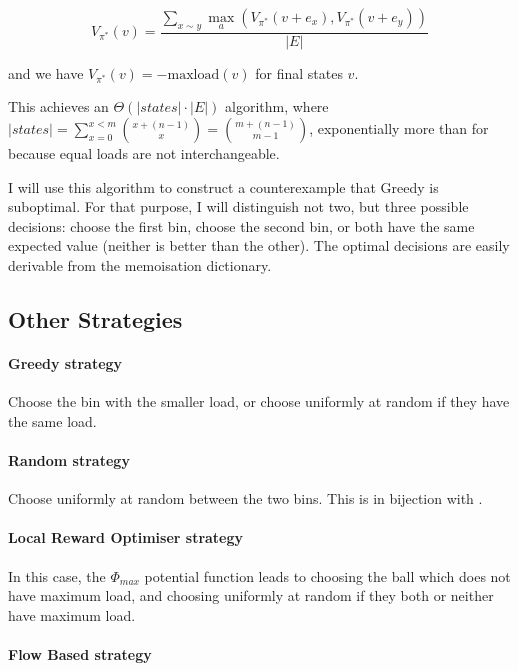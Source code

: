 \begin{equation} \label{eq:graphicaltwochoice-dynamicprogramming}
    V_{\pi^*}(v) = \frac{\sum_{x\sim y}\max_a (V_{\pi^*}(v+e_x), V_{\pi^*}(v+e_y))}{|E|}
\end{equation}


and we have $V_{\pi^*}(v)=-\mathrm{maxload}(v)$ for final states $v$.

This achieves an $\Theta(|states|\cdot |E|)$ algorithm, where $|states| = \sum_{x=0}^{x<m} {{x+(n-1)} \choose {x}} = {{m+(n-1)} \choose {m-1}}$, exponentially more than for \TwoThinning because equal loads are not interchangeable.

I will use this algorithm to construct a counterexample that Greedy is suboptimal. For that purpose, I will distinguish not two, but three possible decisions: choose the first bin, choose the second bin, or both have the same expected value (neither is better than the other). The optimal decisions are easily derivable from the memoisation dictionary.


\subsection{Other Strategies} \label{graphical-otherstrategies}


\paragraph{Greedy strategy} Choose the bin with the smaller load, or choose uniformly at random if they have the same load.


\paragraph{Random strategy} Choose uniformly at random between the two bins. This is in bijection with \OneChoice.


\paragraph{Local Reward Optimiser strategy} In this case, the $\Phi_{max}$ potential function leads to choosing the ball which does not have maximum load, and choosing uniformly at random if they both or neither have maximum load.


\paragraph{Flow Based strategy}

